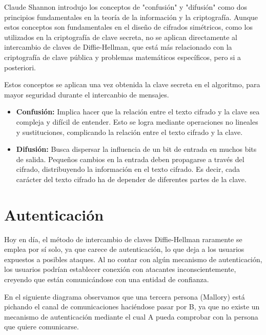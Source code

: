 \documentclass[11pt]{article}
\begin{document}
Claude Shannon introdujo los conceptos de "confusión" y "difusión" como dos principios fundamentales en la teoría de la información y la criptografía. Aunque estos conceptos son fundamentales en el diseño de cifrados simétricos, como los utilizados en la criptografía de clave secreta, no se aplican directamente al intercambio de claves de Diffie-Hellman, que está más relacionado con la criptografía de clave pública y problemas matemáticos específicos, pero si a posteriori.

Estos conceptos se aplican una vez obtenida la clave secreta en el algoritmo, para mayor seguridad durante el intercanbio de mensajes.

\begin{itemize}
	\item \textbf{Confusión:} Implica hacer que la relación entre el texto cifrado y la clave sea compleja y difícil de entender. Esto se logra mediante operaciones no lineales y sustituciones, complicando la relación entre el texto cifrado y la clave.

	\item \textbf{Difusión:} Busca dispersar la influencia de un bit de entrada en muchos bits de salida. Pequeños cambios en la entrada deben propagarse a través del cifrado, distribuyendo la información en el texto cifrado. Es decir, cada carácter del texto cifrado ha de depender de diferentes partes de la clave.
\end{itemize}



\section{Autenticación}

Hoy en día, el método de intercambio de claves Diffie-Hellman raramente se emplea por sí solo, ya que carece de autenticación, lo que deja a los usuarios expuestos a posibles ataques. Al no contar con algún mecanismo de autenticación, los usuarios podrían establecer conexión con atacantes inconscientemente, creyendo que están comunicándose con una entidad de confianza.

\newpage

En el siguiente diagrama observamos que una tercera persona (Mallory) está pichando el canal de comunicaciones haciéndose pasar por B, ya que no existe un mecanismo de autenticación mediante el cual A pueda comprobar con la persona que quiere comunicarse.
\begin{center}\end{center}
\end{document}
